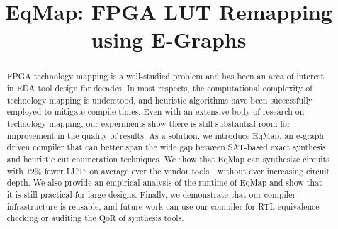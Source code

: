 \documentclass[10pt,conference]{IEEEtran}
\newcommand{\fullname}{EqMap: FPGA LUT Remapping using E-Graphs}
\newcommand{\shortname}{EqMap}
\newcommand{\metric}{12\% fewer LUTs}
\begin{document}
\title{\fullname}
\author{}
\maketitle

\begin{abstract}
    FPGA technology mapping is a well-studied problem and has been an area of
    interest in EDA tool design for decades. In most respects, the computational
    complexity of technology mapping is understood, and heuristic algorithms have
    been successfully employed to mitigate compile times. Even with an extensive
    body of research on technology mapping, our experiments show there is still
    substantial room for improvement in the quality of results. As a solution, we
    introduce \shortname{}, an e-graph driven compiler that can better span the
    wide gap between SAT-based exact synthesis and heuristic cut enumeration
    techniques. We show that \shortname{} can synthesize circuits with \metric{} on
    average over the vendor tools---without ever increasing circuit depth. We also
    provide an empirical analysis of the runtime of \shortname{} and show that it
    is still practical for large designs. Finally, we demonstrate that our compiler
    infrastructure is reusable, and future work can use our compiler for RTL
    equivalence checking or auditing the QoR of synthesis tools.
\end{abstract}












\end{document}
